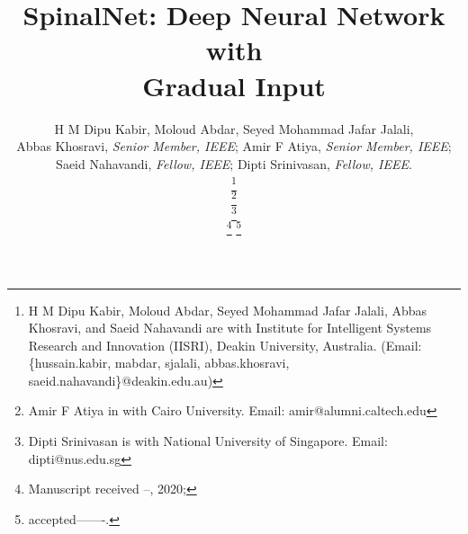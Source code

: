 \documentclass[journal]{IEEEtran}
\begin{document}
\title{SpinalNet: Deep Neural Network with \\Gradual Input}
\author{H M Dipu Kabir, Moloud Abdar, Seyed Mohammad Jafar Jalali, \\Abbas Khosravi, \emph{Senior Member, IEEE}; Amir F Atiya, \emph{Senior Member, IEEE};\\ Saeid Nahavandi, \emph{Fellow, IEEE};  Dipti Srinivasan, \emph{Fellow, IEEE}.

\thanks{H M Dipu Kabir, Moloud Abdar, Seyed Mohammad Jafar Jalali, Abbas Khosravi, and Saeid Nahavandi are with Institute for Intelligent Systems Research and Innovation (IISRI), Deakin University, Australia. (Email: \{hussain.kabir, mabdar, sjalali, abbas.khosravi, saeid.nahavandi\}@deakin.edu.au)}

\thanks{Amir F Atiya in with Cairo University. Email: amir@alumni.caltech.edu}

\thanks{Dipti Srinivasan is with National University of Singapore. Email: dipti@nus.edu.sg}


\thanks{Manuscript received  --, 2020;}
\thanks{accepted-------.}
}













\maketitle
\end{document}
